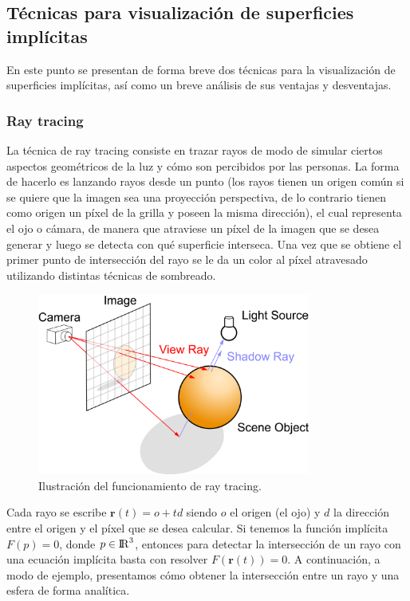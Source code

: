 \documentclass[12pt]{article}
\begin{document}
\subsection{Técnicas para visualización de superficies implícitas}
En este punto se presentan de forma breve dos técnicas para la visualización de superficies implícitas, así como un breve análisis de sus ventajas y desventajas.
\subsubsection{Ray tracing}
La técnica de ray tracing consiste en trazar rayos de modo de simular ciertos aspectos geométricos de la luz y cómo son percibidos por las personas. La forma de hacerlo es lanzando rayos desde un punto (los rayos tienen un origen común si se quiere que la imagen sea una proyección perspectiva, de lo contrario tienen como origen un píxel de la grilla y poseen la misma dirección), el cual representa el ojo o cámara, de manera que atraviese un píxel de la imagen que se desea generar y luego se detecta con qué superficie interseca. Una vez que se obtiene el primer punto de intersección del rayo se le da un color al píxel atravesado utilizando distintas técnicas de sombreado.
\clearpage
\begin{figure}[h!]
\includegraphics[width=0.8\textwidth,center]{raytrace.png}
\caption{Ilustración del funcionamiento de ray tracing.}
\end{figure}
Cada rayo se escribe $\textbf{r}(t)= o +td$ siendo $o$ el origen (el ojo) y $d$ la dirección entre el origen y el píxel que se desea calcular. Si tenemos la función implícita $F(p)=0$, donde $p \in {\rm I\!R} ^3 $, entonces para detectar la intersección de un rayo con una ecuación implícita basta con resolver $F(\textbf{r}(t))=0$.
A continuación, a modo de ejemplo, presentamos cómo obtener la intersección entre un rayo y una esfera de forma analítica\cite{realtimerendering}.
\end{document}
